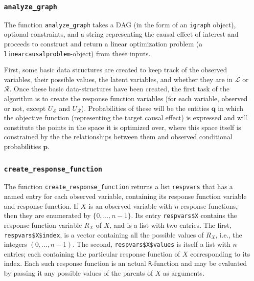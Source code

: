 \hypertarget{analyze_graph}{%
\subsubsection{\texorpdfstring{\texttt{analyze\_graph}}{analyze\_graph}}\label{analyze_graph}}

The function \texttt{analyze\_graph} takes a DAG (in the form of an \texttt{igraph} object), optional constraints, and a string representing the causal effect of interest and proceeds to construct and return a linear optimization problem (a \texttt{linearcausalproblem}-object) from these inputs.

First, some basic data structures are created to keep track of the observed variables, their possible values, the latent variables, and whether they are in \(\mathcal{L}\) or \(\mathcal{R}\). Once these basic data-structures have been created, the first task of the algorithm is to create the response function variables (for each variable, observed or not, except \(U_\mathcal{L}\) and \(U_\mathcal{R}\)). Probabilities of these will be the entities \(\mathbf{q}\) in which the objective function (representing the target causal effect) is expressed and will constitute the points in the space it is optimized over, where this space itself is constrained by the the relationships between them and observed conditional probabilities \(\mathbf{p}\).

\hypertarget{create_response_function}{%
\subsubsection{\texorpdfstring{\texttt{create\_response\_function}}{create\_response\_function}}\label{create_response_function}}

The function \texttt{create\_response\_function} returns a list \texttt{respvars} that has a named entry for each observed variable, containing its response function variable and response function. If \(X\) is an observed variable with \(n\) response functions, then they are enumerated by \(\{0,\dots,n-1\}\). Its entry \texttt{respvars\$X} contains the response function variable \(R_X\) of \(X\), and is a list with two entries. The first, \texttt{respvars\$X\$index}, is a vector containing all the possible values of \(R_X\), i.e., the integers \((0,\dots,n-1)\). The second, \texttt{respvars\$X\$values} is itself a list with \(n\) entries; each containing the particular response function of \(X\) corresponding to its index. Each such response function is an actual \texttt{R}-function and may be evaluated by passing it any possible values of the parents of \(X\) as arguments.

